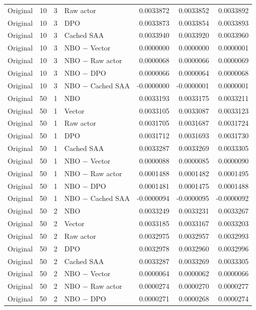 \begin{longtable}{llrlrrr}
Original & 10 & 3 & Raw actor & 0.0033872 & 0.0033852 & 0.0033892 \\
Original & 10 & 3 & DPO & 0.0033873 & 0.0033854 & 0.0033893 \\
Original & 10 & 3 & Cached SAA & 0.0033940 & 0.0033920 & 0.0033960 \\
Original & 10 & 3 & NBO $-$ Vector & 0.0000000 & 0.0000000 & 0.0000001 \\
Original & 10 & 3 & NBO $-$ Raw actor & 0.0000068 & 0.0000066 & 0.0000069 \\
Original & 10 & 3 & NBO $-$ DPO & 0.0000066 & 0.0000064 & 0.0000068 \\
Original & 10 & 3 & NBO $-$ Cached SAA & -0.0000000 & -0.0000001 & 0.0000001 \\
Original & 50 & 1 & NBO & 0.0033193 & 0.0033175 & 0.0033211 \\
Original & 50 & 1 & Vector & 0.0033105 & 0.0033087 & 0.0033123 \\
Original & 50 & 1 & Raw actor & 0.0031705 & 0.0031687 & 0.0031724 \\
Original & 50 & 1 & DPO & 0.0031712 & 0.0031693 & 0.0031730 \\
Original & 50 & 1 & Cached SAA & 0.0033287 & 0.0033269 & 0.0033305 \\
Original & 50 & 1 & NBO $-$ Vector & 0.0000088 & 0.0000085 & 0.0000090 \\
Original & 50 & 1 & NBO $-$ Raw actor & 0.0001488 & 0.0001482 & 0.0001495 \\
Original & 50 & 1 & NBO $-$ DPO & 0.0001481 & 0.0001475 & 0.0001488 \\
Original & 50 & 1 & NBO $-$ Cached SAA & -0.0000094 & -0.0000095 & -0.0000092 \\
Original & 50 & 2 & NBO & 0.0033249 & 0.0033231 & 0.0033267 \\
Original & 50 & 2 & Vector & 0.0033185 & 0.0033167 & 0.0033203 \\
Original & 50 & 2 & Raw actor & 0.0032975 & 0.0032957 & 0.0032993 \\
Original & 50 & 2 & DPO & 0.0032978 & 0.0032960 & 0.0032996 \\
Original & 50 & 2 & Cached SAA & 0.0033287 & 0.0033269 & 0.0033305 \\
Original & 50 & 2 & NBO $-$ Vector & 0.0000064 & 0.0000062 & 0.0000066 \\
Original & 50 & 2 & NBO $-$ Raw actor & 0.0000274 & 0.0000270 & 0.0000277 \\
Original & 50 & 2 & NBO $-$ DPO & 0.0000271 & 0.0000268 & 0.0000274 \\

\end{longtable}
